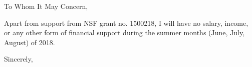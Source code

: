 \documentclass[10pt]{letter} %
\begin{document}

\begin{letter}{} %

\opening{To Whom It May Concern,}

Apart from support from NSF grant no. 1500218, I will have no salary, income, or any other form of financial support during the summer months (June, July, August) of 2018.
\vspace{2\parskip} %
\closing{Sincerely,}
\vspace{2\parskip} %




\end{letter}
 
\end{document}
